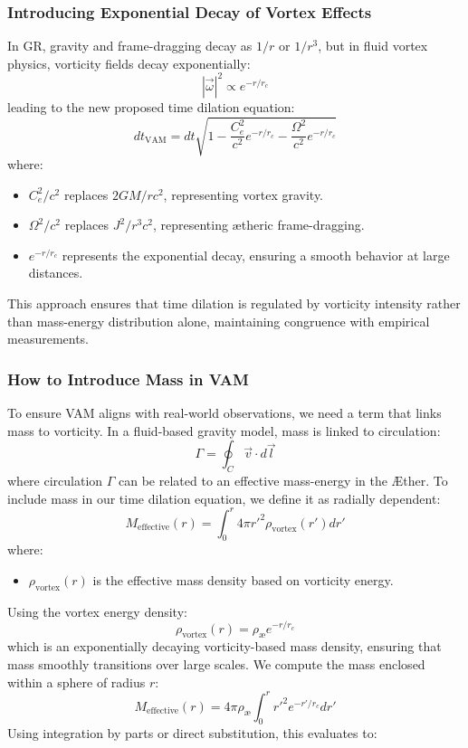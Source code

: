 \subsubsection*{Introducing Exponential Decay of Vortex Effects}
In GR, gravity and frame-dragging decay as $1/r$ or $1/r^3$, but in fluid vortex physics, vorticity fields decay exponentially:
\begin{equation*}
    |\vec{\omega}|^2 \propto e^{-r/r_c}
\end{equation*}
leading to the new proposed time dilation equation:
\begin{equation*}
    dt_{\text{VAM}} = dt \sqrt{1 - \frac{C_e^2}{c^2} e^{-r/r_c} - \frac{\Omega^2}{c^2} e^{-r/r_c}}
\end{equation*}
where:
\begin{itemize}
    \item $C_e^2/c^2$ replaces $2GM/r c^2$, representing vortex gravity.
    \item $\Omega^2/c^2$ replaces $J^2/r^3 c^2$, representing ætheric frame-dragging.
    \item $e^{-r/r_c}$ represents the exponential decay, ensuring a smooth behavior at large distances.
\end{itemize}
This approach ensures that time dilation is regulated by vorticity intensity rather than mass-energy distribution alone, maintaining congruence with empirical measurements.

\subsubsection*{How to Introduce Mass in VAM}
To ensure VAM aligns with real-world observations, we need a term that links mass to vorticity. In a fluid-based gravity model, mass is linked to circulation:
\begin{equation*}
    \Gamma = \oint_C \vec{v} \cdot d\vec{l}
\end{equation*}
where circulation $\Gamma$ can be related to an effective mass-energy in the Æther. To include mass in our time dilation equation, we define it as radially dependent:
\begin{equation*}
    M_{\text{effective}}(r) = \int_0^r 4\pi r'^2 \rho_{\text{vortex}}(r') dr'
\end{equation*}
where:
\begin{itemize}
    \item $\rho_{\text{vortex}}(r)$ is the effective mass density based on vorticity energy.
\end{itemize}
Using the vortex energy density:
\begin{equation*}
    \rho_{\text{vortex}}(r) = \rho_\text{\ae} e^{-r / r_c}
\end{equation*}
which is an exponentially decaying vorticity-based mass density, ensuring that mass smoothly transitions over large scales. We compute the mass enclosed within a sphere of radius $r$:
\begin{equation*}
    M_{\text{effective}}(r) = 4\pi \rho_\text{\ae} \int_0^r r'^2 e^{-r' / r_c} dr'
\end{equation*}
Using integration by parts or direct substitution, this evaluates to:

